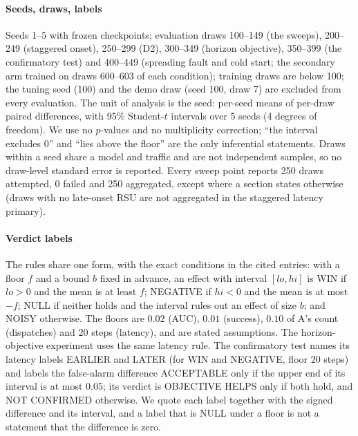 \paragraph*{Seeds, draws, labels}
Seeds 1--5 with frozen checkpoints; evaluation draws 100--149 (the sweeps), 200--249 (staggered onset), 250--299 (D2), 300--349 (horizon objective), 350--399 (the confirmatory test) and 400--449 (spreading fault and cold start; the secondary arm trained on draws 600--603 of each condition); training draws are below 100; the tuning seed (100) and the demo draw (seed 100, draw 7) are excluded from every evaluation.
The unit of analysis is the seed: per-seed means of per-draw paired differences, with 95\% Student-$t$ intervals over 5 seeds (4 degrees of freedom).
We use no $p$-values and no multiplicity correction; ``the interval excludes $0$'' and ``lies above the floor'' are the only inferential statements.
Draws within a seed share a model and traffic and are not independent samples, so no draw-level standard error is reported.
Every sweep point reports 250 draws attempted, 0 failed and 250 aggregated, except where a section states otherwise (draws with no late-onset RSU are not aggregated in the staggered latency primary).

\paragraph*{Verdict labels}
The rules share one form, with the exact conditions in the cited entries: with a floor $f$ and a bound $b$ fixed in advance, an effect with interval $[lo,hi]$ is WIN if $lo>0$ and the mean is at least $f$; NEGATIVE if $hi<0$ and the mean is at most $-f$; NULL if neither holds and the interval rules out an effect of size $b$; and NOISY otherwise.
The floors are $0.02$ (AUC), $0.01$ (success), $0.10$ of A's count (dispatches) and $20$ steps (latency), and are stated assumptions.
The horizon-objective experiment uses the same latency rule. The confirmatory test names its latency labels EARLIER and LATER (for WIN and NEGATIVE, floor $20$ steps) and labels the false-alarm difference ACCEPTABLE only if the upper end of its interval is at most $0.05$; its verdict is OBJECTIVE HELPS only if both hold, and NOT CONFIRMED otherwise.
We quote each label together with the signed difference and its interval, and a label that is NULL under a floor is not a statement that the difference is zero.

